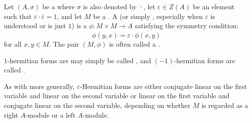 \begin{definition} \label{definition:varepsilon_hermitian_form_on_a_module_over_a_ring_with_involution}
Let $(A, \sigma)$ be a  where $\sigma$ is also denoted by $\overline{\cdot}$, let $\varepsilon \in Z(A)$ be an element such that $\varepsilon \cdot \overline{\varepsilon} = 1$, and let $M$ be a .
A  (or simply , especially when $\varepsilon$ is understood or is just $1$) is a  $\phi: M \times M \to A$ satisfying the symmetry condition:
$$ \phi(y, x) = \varepsilon \cdot \overline{\phi(x, y)} $$
for all $x, y \in M$. The pair $(M, \phi)$ is often called a .

$1$-hermitian forms are may simply be called , and $(-1)$-hermitian forms are called .

As with  more generally, $\varepsilon$-Hermitian forms are either conjugate linear on the first variable and linear on the second variable or linear on the first variable and conjugate linear on the second variable, depending on whether $M$ is regarded as a right $A$-module or a left $A$-module.
\end{definition}